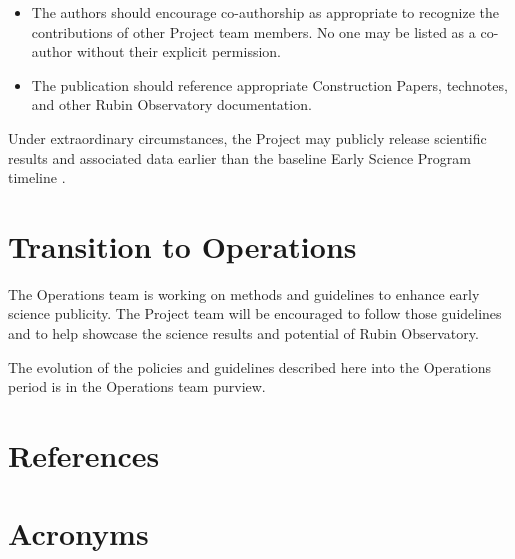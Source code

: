 \documentclass[SE,authoryear,toc,lsstdraft]{lsstdoc}
\begin{document}
\begin{itemize}
  \item The authors should encourage co-authorship as appropriate to recognize the contributions of other Project team members.
  No one may be listed as a co-author without their explicit permission.

  \item The publication should reference appropriate Construction Papers, technotes, and other Rubin Observatory documentation.

\end{itemize}

Under extraordinary circumstances, the Project may publicly release scientific results and associated data earlier than the baseline Early Science Program timeline .

\section{Transition to Operations}
\label{operations}

The Operations team is working on methods and guidelines to enhance early science publicity.
The Project team will be encouraged to follow those guidelines and to help showcase the science results and potential of Rubin Observatory.

The evolution of the policies and guidelines described here into the Operations period is in the Operations team purview.


\appendix
\section{References} \label{sec:bib}
\renewcommand{\refname}{} %


\section{Acronyms} \label{sec:acronyms}

\end{document}
